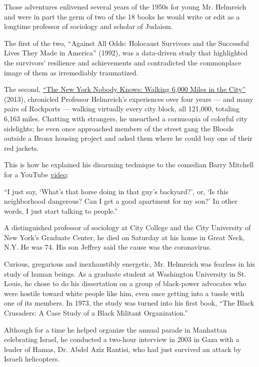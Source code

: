 Those adventures enlivened several years of the 1950s for young Mr.
Helmreich and were in part the germ of two of the 18 books he would
write or edit as a longtime professor of sociology and scholar of
Judaism.

The first of the two, ``Against All Odds: Holocaust Survivors and the
Successful Lives They Made in America'' (1992), was a data-driven study
that highlighted the survivors' resilience and achievements and
contradicted the commonplace image of them as irremediably traumatized.

The second,
\href{https://www.nytimes3xbfgragh.onion/2017/01/12/nyregion/brooklyn-nobody-knows-william-b-helmreich.html}{``The
New York Nobody Knows: Walking 6,000 Miles in the City''} (2013),
chronicled Professor Helmreich's experiences over four years --- and
many pairs of Rockports --- walking virtually every city block, all
121,000, totaling 6,163 miles. Chatting with strangers, he unearthed a
cornucopia of colorful city sidelights; he even once approached members
of the street gang the Bloods outside a Bronx housing project and asked
them where he could buy one of their red jackets.

This is how he explained his disarming technique to the comedian Barry
Mitchell for a YouTube
\href{https://www.youtube.com/watch?v=yQRiZP6jHFQ\&t=1s}{video}:

``I just say, `What's that horse doing in that guy's backyard?', or, `Is
this neighborhood dangerous? Can I get a good apartment for my son?' In
other words, I just start talking to people.''

A distinguished professor of sociology at City College and the City
University of New York's Graduate Center, he died on Saturday at his
home in Great Neck, N.Y. He was 74. His son Jeffrey said the cause was
the coronavirus.

Curious, gregarious and inexhaustibly energetic, Mr. Helmreich was
fearless in his study of human beings. As a graduate student at
Washington University in St. Louis, he chose to do his dissertation on a
group of black-power advocates who were hostile toward white people like
him, even once getting into a tussle with one of its members. In 1973,
the study was turned into his first book, ``The Black Crusaders: A Case
Study of a Black Militant Organization.''

Although for a time he helped organize the annual parade in Manhattan
celebrating Israel, he conducted a two-hour interview in 2003 in Gaza
with a leader of Hamas, Dr. Abdel Aziz Rantisi, who had just survived an
attack by Israeli helicopters.

